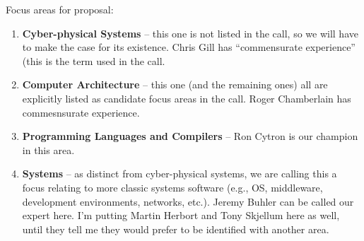 Focus areas for proposal:
\begin{enumerate}

\item {\bf Cyber-physical Systems} -- this one is not listed in the call, so we
will have to make the case for its existence.  Chris Gill has ``commensurate 
experience'' (this is the term used in the call.

\item {\bf Computer Architecture} -- this one (and the remaining ones) all are
explicitly listed as candidate focus areas in the call.  Roger Chamberlain has
commesnsurate experience.

\item {\bf Programming Languages and Compilers} -- Ron Cytron is our
champion in this area.

\item {\bf Systems} -- as distinct from cyber-physical systems, we are
calling this a focus relating to more classic systems software (e.g., OS,
middleware, development environments, networks, etc.).  Jeremy Buhler can be called
our expert here. I'm putting Martin Herbort and Tony Skjellum here as well,
until they tell me they would prefer to be identified with another area.


\end{enumerate}